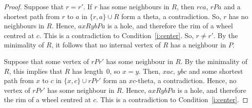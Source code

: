\documentclass[10pt,a4paper]{amsart}
\begin{document}
\begin{proof}
  Suppose that $r=r'$.  If $r$ has some neighbours in $R$, then $rca$, $rPa$ and a shortest path from $r$ to $a$ in $\{r, a\} \cup R$ form a theta, a contradiction. So, $r$ has no neighbours in $R$.  
  Hence, $axRybPa$ is a hole, and therefore the rim of a wheel centred at $c$.  
  This is a contradiction to Condition~\ref{i:center}.  So, $r\neq r'$.  By the minimality of $R$, it follows that no internal vertex of $R$ has a neighbour in $P$.   
  
  Suppose that some vertex of $rPr'$  has some neighbour in $R$.  By the minimality of $R$, this implies that $R$ has length~0, so $x=y$.  Then, $xac$, $ybc$ and some shortest path from $x$ to $c$ in $\{x, c\} \cup rPr'$ form an $xc$-theta, a contradiction. Hence, no vertex of $rPr'$ has some neighbour in $R$. 
  Hence, $axRybPa$ is a hole,  and therefore the rim of a wheel centred at $c$.  This is a contradiction to Condition~\ref{i:center}. 
\end{proof}
\end{document}
